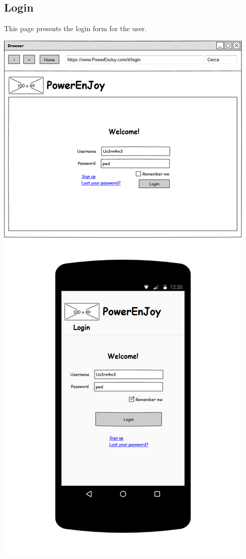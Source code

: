 \subsection{Login} This page presents the login form for the user.
\begin{center}
	\includegraphics[width=0.6\linewidth]{"img/ui/login"}
\end{center}
\pagebreak

